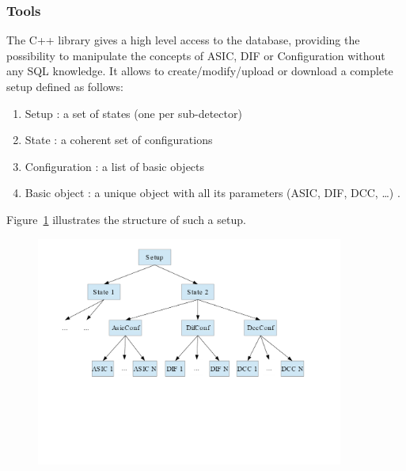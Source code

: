 \documentclass[english]{article}
\begin{document}
\subsubsection{Tools}

The C++ library gives a high level access to the database, providing
the possibility to manipulate the concepts of ASIC, DIF or Configuration
without any SQL knowledge. It allows to create/modify/upload or download
a complete setup defined as follows:

\begin{enumerate}
\item  Setup : a set of \textquotedbl{}states\textquotedbl{} (one per sub-detector)
\item State : a coherent set of \textquotedbl{}configurations\textquotedbl{}
\item Configuration : a list of basic objects 
\item Basic object : a unique object
with all its parameters (ASIC, DIF, DCC, \ldots{}) . 
\end{enumerate}
Figure~\ref{DBSetupStructure}  illustrates the structure of such a setup.
\begin{figure}
\centerline{\includegraphics[width=0.9\textwidth]{./setup_structure.png}}
\caption{}
\label{DBSetupStructure}
\end{figure}
\end{document}
